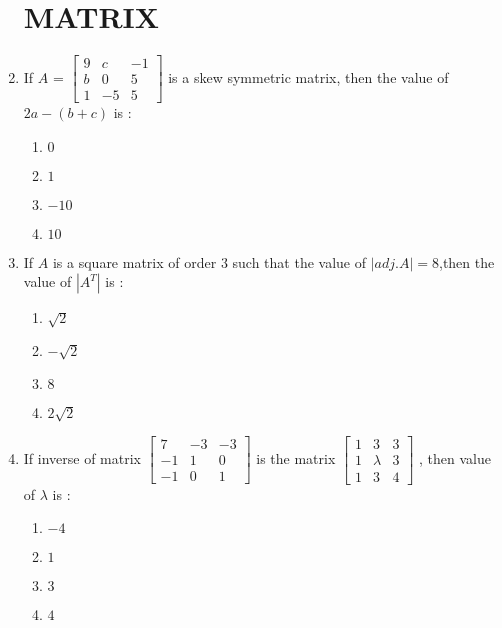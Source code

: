 \documentclass{article}
\providecommand{\myvec}[1]{\ensuremath{\begin{bmatrix}#1\end{bmatrix}}}
\begin{document}
		\begin{enumerate}
			\section{MATRIX}
		\item If $A$ = $\myvec{9 & c & -1 \\b & 0 & 5\\1 & -5 & 5}$ is a skew symmetric matrix, then the value of $2a - (b+c)$ is :                                                   \begin{enumerate}[label=(\Alph*)]
        \item ${0}$
        \item ${1}$
        \item ${-10}$
        \item ${10}$
        \end{enumerate}

\item If $A$ is a square matrix of order $3$ such that the value of $|adj.A| = 8$,then the value of $|A^T|$ is :                                                                      \begin{enumerate}[label=(\Alph*)]
                \item $\sqrt{2}$
                        \item $-\sqrt{2}$
                        \item $8$
                        \item $2 \sqrt{2}$
        \end{enumerate}


        \item If inverse of matrix $\myvec{7 & -3 & -3 \\-1 & 1 & 0\\-1 & 0 & 1}$ is the matrix $\myvec{1 & 3 & 3\\1 & \lambda & 3\\1 & 3 & 4}$ ,  then value of $\lambda$ is :                                                                                          \begin{enumerate}[label=(\Alph*)]
                \item $-4$
                        \item $1$
                        \item$3$                                                                           \item $4$                                                          \end{enumerate}



\end{enumerate}
\end{document}
